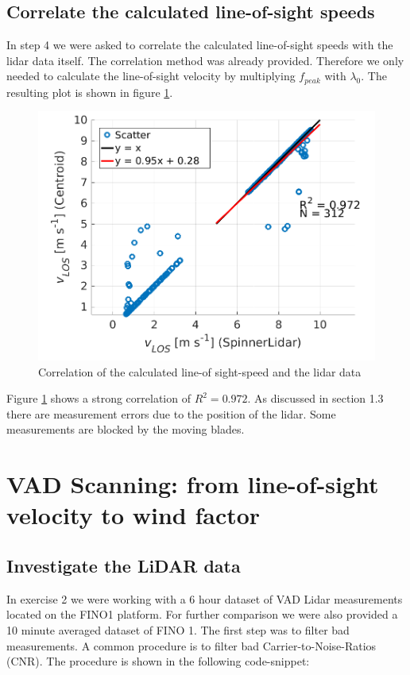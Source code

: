 \documentclass[10pt]{article}
\begin{document}
\subsection{Correlate the calculated line-of-sight speeds}
In step 4 we were asked to correlate the calculated line-of-sight speeds with the lidar data itself. The correlation method was already provided. Therefore we only needed to calculate the line-of-sight velocity by multiplying $f_{peak}$ with $\lambda_0$. The resulting plot is shown in figure \ref{fig:correlation}. 

\begin{figure}[H]
\includegraphics[width=1\linewidth]{../Exercises_and_Tasks/ex1/figures/correlation.png}
\caption{Correlation of the calculated line-of sight-speed and the lidar data}
\label{fig:correlation}
\end{figure}

Figure \ref{fig:correlation} shows a strong correlation of $R^2 = 0.972$. As discussed in section 1.3 there are measurement errors due to the position of the lidar. Some measurements are blocked by the moving blades. 
\section{VAD Scanning: from line-of-sight velocity to wind factor}
\subsection{Investigate the LiDAR data}
In exercise 2 we were working with a 6 hour dataset of VAD Lidar measurements located on the FINO1 platform. For further comparison we were also provided a 10 minute averaged dataset of FINO 1.
The first step was to filter bad measurements. A common procedure is to filter bad Carrier-to-Noise-Ratios (CNR). 
The procedure is shown in the following code-snippet:
\end{document}
